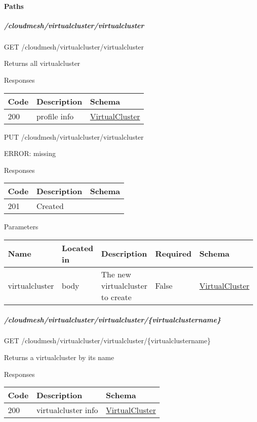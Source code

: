 \documentclass[9pt,]{article}
\let\oldparagraph\paragraph
\renewcommand{\paragraph}[1]{\oldparagraph{#1}\mbox{}}
\let\oldsubparagraph\subparagraph
\renewcommand{\subparagraph}[1]{\oldsubparagraph{#1}\mbox{}}
\begin{document}
\hypertarget{paths-11}{%
\paragraph{Paths}\label{paths-11}}

\hypertarget{cloudmeshvirtualclustervirtualcluster}{%
\subparagraph{/cloudmesh/virtualcluster/virtualcluster}\label{cloudmeshvirtualclustervirtualcluster}}

GET /cloudmesh/virtualcluster/virtualcluster

Returns all virtualcluster

Responses

\begin{longtable}[]{@{}lll@{}}
\toprule
Code & Description & Schema\tabularnewline
\midrule
\endhead
200 & profile info &
\protect\hyperlink{virtualcluster}{VirtualCluster}\tabularnewline
\bottomrule
\end{longtable}

PUT /cloudmesh/virtualcluster/virtualcluster

ERROR: missing

Responses

\begin{longtable}[]{@{}lll@{}}
\toprule
Code & Description & Schema\tabularnewline
\midrule
\endhead
201 & Created &\tabularnewline
\bottomrule
\end{longtable}

Parameters

\begin{longtable}[]{@{}lllll@{}}
\toprule
Name & Located in & Description & Required & Schema\tabularnewline
\midrule
\endhead
virtualcluster & body & The new virtualcluster to create & False &
\protect\hyperlink{virtualcluster}{VirtualCluster}\tabularnewline
\bottomrule
\end{longtable}

\hypertarget{cloudmeshvirtualclustervirtualclustervirtualclustername}{%
\subparagraph{/cloudmesh/virtualcluster/virtualcluster/\{virtualclustername\}}\label{cloudmeshvirtualclustervirtualclustervirtualclustername}}

GET /cloudmesh/virtualcluster/virtualcluster/\{virtualclustername\}

Returns a virtualcluster by its name

Responses

\begin{longtable}[]{@{}lll@{}}
\toprule
Code & Description & Schema\tabularnewline
\midrule
\endhead
200 & virtualcluster info &
\protect\hyperlink{virtualcluster}{VirtualCluster}\tabularnewline
\bottomrule
\end{longtable}
\end{document}
